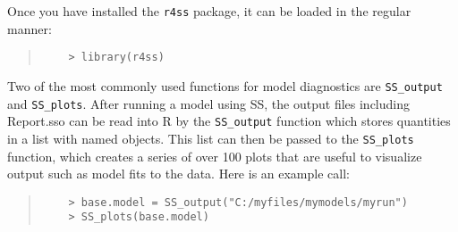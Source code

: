 Once you have installed the \texttt{r4ss} package, it can be loaded in the regular manner:

\begin{quote}
	\begin{verbatim}
	> library(r4ss)
	\end{verbatim}
\end{quote}

Two of the most commonly used functions for model diagnostics are \texttt{SS\_output} and \texttt{SS\_plots}. After running a model using SS, the output files including Report.sso can be read into R by the \texttt{SS\_output} function which stores quantities in a list with named objects.  This list can then be passed to the \texttt{SS\_plots} function, which creates a series of over 100 plots that are useful to visualize output such as model fits to the data. Here is an example call:

\begin{quote}
	\begin{verbatim}
	> base.model = SS_output("C:/myfiles/mymodels/myrun")
	> SS_plots(base.model)
	\end{verbatim}
\end{quote}
  
